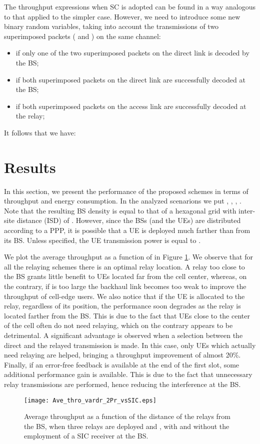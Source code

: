 \documentclass[12pt, letterpaper, onecolumn, draftcls]{IEEEtran}
\newcommand{\figw}{0.55\columnwidth}
\begin{document}
The throughput expressions when SC is adopted can be found in a way analogous to that applied to the simpler case. However, we need to introduce some new binary random variables, taking into account the transmissions of two superimposed packets ( and ) on the same channel:
\begin{itemize}
 \item  if only one of the two superimposed packets on the direct link is decoded by the BS;
 \item  if both superimposed packets on the direct link are successfully decoded at the BS;
 \item  if both superimposed packets on the access link are successfully decoded at the relay;
\end{itemize}

It follows that we have:



\section{Results}
\label{results}
In this section, we present the performance of the proposed schemes in terms of throughput and energy consumption. In the analyzed scenarions we put , , , .
Note that the resulting BS density is equal to that of a hexagonal grid with inter-site distance (ISD) of . However, since the BSs (and the UEs) are distributed according to a PPP, it is possible that a UE is deployed much farther than  from its BS. Unless specified, the UE transmission power  is equal to .

We plot the average throughput as a function of  in Figure \ref{fig:Ave_thro_vardr_2Pr_vsSIC}. We observe that for all the relaying schemes there is an optimal relay location. A relay too close to the BS grants little benefit to UEs located far from the cell center, whereas, on the contrary, if  is too large the backhaul link becomes too weak to improve the throughput of cell-edge users.
We also notice that if the UE is allocated to the relay, regardless of its position, the performance soon degrades as the relay is located farther from the BS. This is due to the fact that UEs close to the center of the cell often do not need relaying, which on the contrary appears to be detrimental. A significant advantage is observed when a selection between the direct and the relayed transmission is made.
In this case, only UEs which actually need relaying are helped, bringing a throughput improvement of almost 20\%. Finally, if an error-free feedback is available at the end of the first slot, some additional performance gain is available. This is due to the fact that unnecessary relay transmissions are performed, hence reducing the interference at the BS. 
\begin{figure}
    \centering
    \texttt{[image: Ave\_thro\_vardr\_2Pr\_vsSIC.eps]}
     \caption{\small Average throughput as a function of the distance of the relays from the BS, when three relays are deployed and , with and without the employment of a SIC receiver at the BS.}
     \vspace{-1cm}
  \label{fig:Ave_thro_vardr_2Pr_vsSIC}
\end{figure}
\end{document}
